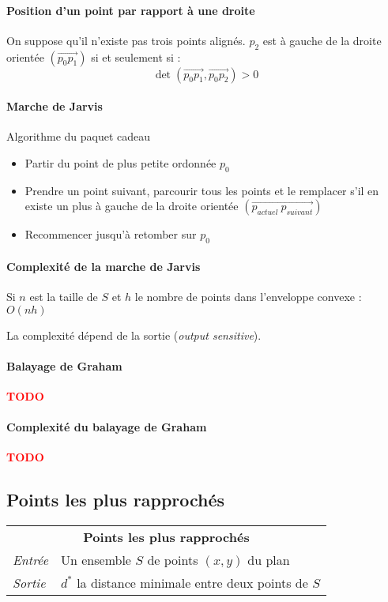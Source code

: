 \documentclass[french]{article}
\newcommand{\TODO}{\textcolor{red}{\textbf{TODO}}}
\begin{document}
\paragraph{Position d'un point par rapport à une droite} On suppose qu'il n'existe pas trois points alignés. $p_2$ est à gauche de la droite orientée $(\vec{p_0p_1})$ si et seulement si :
 \[ \det(\vec{p_0p_1}, \vec{p_0p_2}) > 0 \]
 
\paragraph{Marche de Jarvis} Algorithme du paquet cadeau
\begin{itemize}
	\item Partir du point de plus petite ordonnée $p_0$
	\item Prendre un point suivant, parcourir tous les points et le remplacer s'il en existe un plus à gauche de la droite orientée $(\vec{p_{actuel}~p_{suivant}})$
	\item Recommencer jusqu'à retomber sur $p_0$
\end{itemize}

\paragraph{Complexité de la marche de Jarvis} Si $n$ est la taille de $S$ et $h$ le nombre de points dans l'enveloppe convexe : $O(nh)$

La complexité dépend de la sortie (\emph{output sensitive}).


\paragraph{Balayage de Graham}\TODO

\paragraph{Complexité du balayage de Graham}\TODO

\subsection{Points les plus rapprochés}

\vspace{0.5cm}
\begin{tabularx}{\textwidth}{p{1cm}X}
\multicolumn{2}{c}{\textbf{Points les plus rapprochés}} \\ 
\emph{Entrée} & Un ensemble $S$ de points $(x,y)$ du plan \\ 
\emph{Sortie} & $d^*$ la distance minimale entre deux points de $S$ \\
\end{tabularx}
\end{document}

